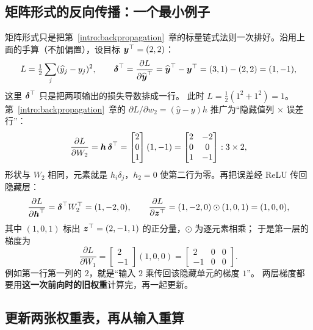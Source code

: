 \subsection{矩阵形式的反向传播：一个最小例子}
\label{sec:mlp-matrix-gradient}

矩阵形式只是把第~\ref*{intro:backpropagation}~章的标量链式法则一次排好。沿用上面的手算（不加偏置），设目标 $\boldsymbol{y}^\top=(2,2)$：
\[
L=\tfrac12\sum_j(\widehat{y}_j-y_j)^2,\qquad
\boldsymbol{\delta}^\top=\frac{\partial L}{\partial\widehat{\boldsymbol{y}}^\top}
=\widehat{\boldsymbol{y}}^\top-\boldsymbol{y}^\top=(3,1)-(2,2)=(1,-1),
\]
这里 $\boldsymbol{\delta}^\top$ 只是把两项输出的损失导数排成一行。
此时 $L=\tfrac12(1^2+1^2)=1$。第~\ref*{intro:backpropagation}~章的
$\partial L/\partial w_2=(\widehat{y}-y)h$ 推广为“隐藏值列 $\times$ 误差行”：
\[
\frac{\partial L}{\partial W_2}=\boldsymbol{h}\,\boldsymbol{\delta}^\top
=\begin{bmatrix}2\\0\\1\end{bmatrix}(1,-1)
=\begin{bmatrix}2&-2\\0&0\\1&-1\end{bmatrix}:3\times2,
\]
形状与 $W_2$ 相同，元素就是 $h_i\delta_j$，$h_2=0$ 使第二行为零。再把误差经 ReLU 传回隐藏层：
\[
\frac{\partial L}{\partial\boldsymbol{h}^\top}=\boldsymbol{\delta}^\top W_2^\top=(1,-2,0),\qquad
\frac{\partial L}{\partial\boldsymbol{z}^\top}=(1,-2,0)\odot(1,0,1)=(1,0,0),
\]
其中 $(1,0,1)$ 标出 $\boldsymbol{z}^\top=(2,-1,1)$ 的正分量，$\odot$ 为逐元素相乘；
于是第一层的梯度为
\[
\frac{\partial L}{\partial W_1}
=\begin{bmatrix}2\\-1\end{bmatrix}(1,0,0)
=\begin{bmatrix}2&0&0\\-1&0&0\end{bmatrix}.
\]
例如第一行第一列的 $2$，就是“输入 $2$ 乘传回该隐藏单元的梯度 $1$”。
两层梯度都要用\textbf{这一次前向时的旧权重}计算完，再一起更新。

\subsection{更新两张权重表，再从输入重算}
\label{sec:mlp-update-check}

